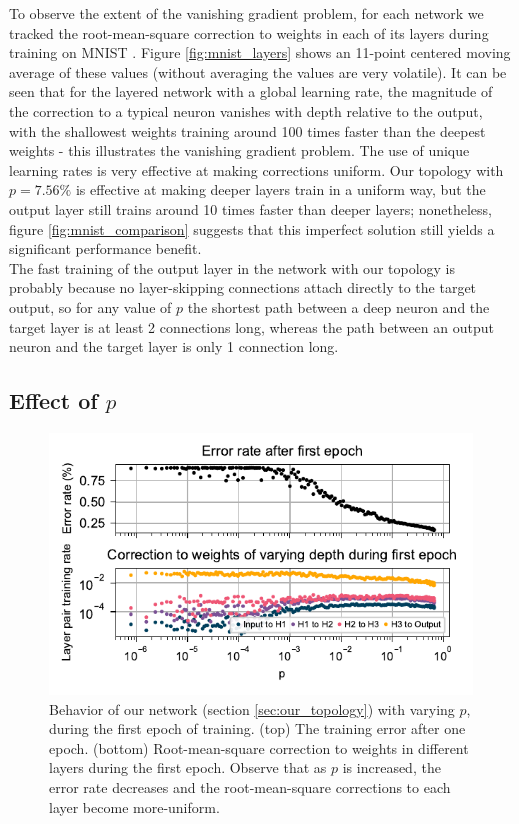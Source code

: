 \documentclass[utf8]{frontiersSCNS}
\newcommand{\npar}{\\\indent}
\begin{document}
To observe the extent of the vanishing gradient problem, for each network we tracked the root-mean-square correction to weights in each of its layers during training on MNIST \cite{mnist1998}. Figure \ref{fig:mnist_layers} shows an 11-point centered moving average of these values (without averaging the values are very volatile). It can be seen that for the layered network with a global learning rate, the magnitude of the correction to a typical neuron vanishes with depth relative to the output, with the shallowest weights training around 100 times faster than the deepest weights - this illustrates the vanishing gradient problem. The use of unique learning rates is very effective at making corrections uniform. Our topology with $p=7.56\%$ is effective at making deeper layers train in a uniform way, but the output layer still trains around 10 times faster than deeper layers; nonetheless, figure \ref{fig:mnist_comparison} suggests that this imperfect solution still yields a significant performance benefit.
\npar
The fast training of the output layer in the network with our topology is probably because no layer-skipping connections attach directly to the target output, so for any value of $p$ the shortest path between a deep neuron and the target layer is at least 2 connections long, whereas the path between an output neuron and the target layer is only 1 connection long.

\subsection{Effect of $p$}
\label{sec:mnist_1epoch}

\begin{figure}
  \centering
  \includegraphics[width=\columnwidth]{figures/MNIST_one_epoch_performance.pdf}
  \caption{Behavior of our network (section \ref{sec:our_topology}) with varying $p$, during the first epoch of training. (top) The training error after one epoch. (bottom) Root-mean-square correction to weights in different layers during the first epoch. Observe that as $p$ is increased, the error rate decreases and the root-mean-square corrections to each layer become more-uniform.}
  \label{fig:mnist_1epoch}
\end{figure}
\end{document}
